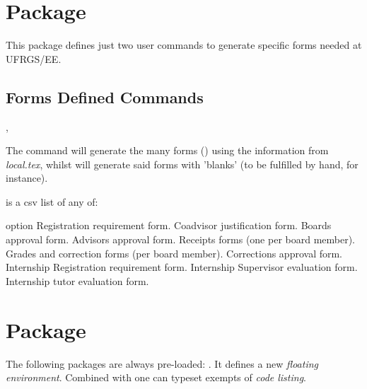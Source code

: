 \documentclass[article,nogeometry,english,tocdepth=3,secdepth=3]{ufrgscca} %
\begin{document}
\section{ Package}
This package defines just two user commands to generate specific forms needed at UFRGS/EE.
\subsection{Forms Defined Commands}\label{forms.commands}
\begin{codedescribe}{\tcforms,\tcemptyforms}
	\begin{codesyntax}%
\end{codesyntax}
The command \tsmacro{\tcforms}{} will generate the many forms () using the information from \emph{local.tex}, whilst \tsmacro{\tcemptyforms}{} will generate said forms with 'blanks' (to be fulfilled by hand, for instance).

\end{codedescribe}

 is a csv list of any of:
\begin{describelist*}{option}
     { Registration requirement form.}
     { Coadvisor justification form.}
     { Boards approval form.}
     { Advisors approval form.}
     { Receipts forms (one per board member).}
     { Grades and correction forms (per board member).}
     { Corrections approval  form.}
     { Internship Registration requirement form.}
     { Internship Supervisor evaluation form.}
     { Internship tutor evaluation form.}
\end{describelist*}


\section{ Package}
The following packages are always pre-loaded: .
It defines a new \emph{floating environment}. Combined with  one can typeset exempts of \emph{code listing}.
\end{document}

